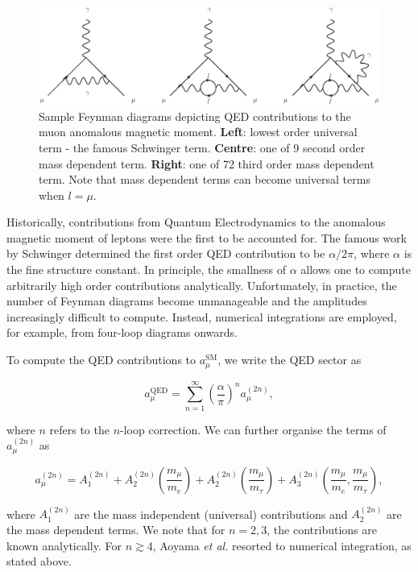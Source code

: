\documentclass{article}
\numberwithin{equation}{section} %
\begin{document}
\begin{figure}[t]
    \centering
    \includegraphics[width=12cm]{qed.eps}%
    \caption{Sample Feynman diagrams depicting QED contributions to the muon anomalous magnetic moment. \textbf{Left}: lowest order universal term - the famous Schwinger term. \textbf{Centre}: one of 9 second order mass dependent term. \textbf{Right}: one of 72 third order mass dependent term. Note that mass dependent terms can become universal terms when $l=\mu$.}%
    \label{qedfeynman}%
\end{figure}

Historically, contributions from Quantum Electrodynamics to the anomalous magnetic moment of leptons were the first to be accounted for. The famous work by Schwinger\cite{schwinger} determined the first order QED contribution to be $\alpha/2\pi$, where $\alpha$ is the fine structure constant. In principle, the smallness of $\alpha$ allows one to compute arbitrarily high order contributions analytically. Unfortunately, in practice, the number of Feynman diagrams become unmanageable and the amplitudes increasingly difficult to compute. Instead, numerical integrations are employed, for example, from four-loop diagrams onwards\cite{aoyama}.

To compute the QED contributions to $a_\mu^\mathrm{SM}$, we write the QED sector as

\begin{equation}
a_\mu^\mathrm{QED} = \sum_{n=1}^\infty \left(\frac{\alpha}{\pi}\right)^n a_\mu^{(2n)},
\label{aqed}
\end{equation}

\noindent where $n$ refers to the $n$-loop correction. We can further organise the terms of $a_\mu^{(2n)}$ as

\begin{equation}
a_\mu^{(2n)} = A_1^{(2n)} + A_2^{(2n)}\left(\frac{m_\mu}{m_e}\right) + A_2^{(2n)}\left(\frac{m_\mu}{m_\tau}\right) + A_3^{(2n)}\left(\frac{m_\mu}{m_e}, \frac{m_\mu}{m_\tau}\right),
\end{equation}

\noindent where $A_1^{(2n)}$ are the mass independent (universal) contributions and $A_2^{(2n)}$ are the mass dependent terms. We note that for $n=2,3$, the contributions are known analytically. For $n\gtrsim 4$, Aoyama \textit{et al.} resorted to numerical integration, as stated above. 
\end{document}
